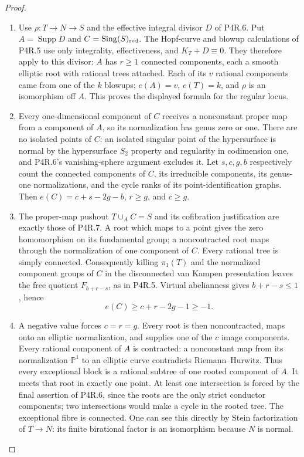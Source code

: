 \begin{proof}

\begin{enumerate}[label={$\langle1\rangle$\arabic*.},leftmargin=*]
\item Use $\rho:T\to N\to S$ and the effective
integral divisor $D$ of P4R.6. Put
$A=\operatorname{Supp}D$ and
$C=\operatorname{Sing}(S)_{\rm red}$.
The Hopf-curve and blowup calculations of
P4R.5 use only integrality, effectiveness,
and $K_T+D\equiv0$. They therefore apply
to this divisor: $A$ has $r\ge1$ connected
components, each a smooth elliptic root
with rational trees attached. Each of its
$v$ rational components came from one of
the $k$ blowups; $e(A)=v$, $e(T)=k$, and
$\rho$ is an isomorphism off $A$. This
proves the displayed formula for the
regular locus.

\item Every one-dimensional component of $C$
receives a nonconstant proper map from a
component of $A$, so its normalization
has genus zero or one. There are no
isolated points of $C$: an isolated
singular point of the hypersurface is
normal by the hypersurface $S_2$ property
and regularity in codimension one, and
P4R.6's vanishing-sphere argument excludes
it. Let $s,c,g,b$ respectively count the
connected components of $C$, its
irreducible components, its genus-one
normalizations, and the cycle ranks of
its point-identification graphs.
Then $e(C)=c+s-2g-b$, $r\ge g$, and
$c\ge g$.

\item The proper-map pushout $T\cup_A C=S$
and its cofibration justification are
exactly those of P4R.7. A root which
maps to a point gives the zero
homomorphism on its fundamental group;
a noncontracted root maps through the
normalization of one component of $C$.
Every rational tree is simply connected.
Consequently killing $\pi_1(T)$ and
the normalized component groups of $C$
in the disconnected van Kampen
presentation leaves the free quotient
$F_{b+r-s}$, as in P4R.5. Virtual
abelianness gives $b+r-s\le1$, hence
\[
 e(C)\ge c+r-2g-1\ge-1.
\]

\item A negative value forces $c=r=g$.
Every root is then noncontracted, maps
onto an elliptic normalization, and
supplies one of the $c$ image components.
Every rational component of $A$ is
contracted: a nonconstant map from its
normalization $\mathbb P^1$ to an
elliptic curve contradicts
Riemann--Hurwitz. Thus every exceptional
block is a rational subtree of one
rooted component of $A$. It meets that
root in exactly one point. At least one
intersection is forced by the final
assertion of P4R.6, since the roots are
the only strict conductor components;
two intersections would make a cycle
in the rooted tree. The exceptional
fibre is connected. One can see this
directly by Stein factorization of
$T\to N$: its finite birational factor
is an isomorphism because $N$ is normal.


\end{enumerate}
\end{proof}
